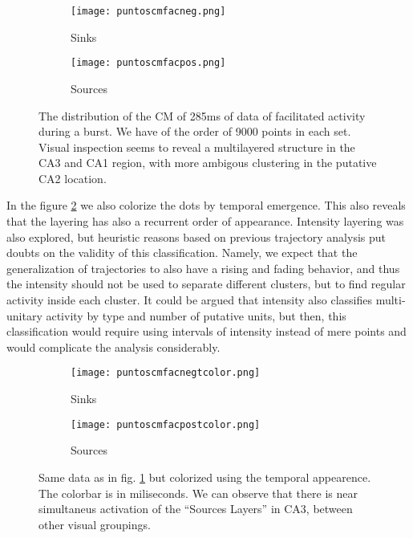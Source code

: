 \documentclass{article}
\begin{document}
\begin{figure}
\centering
\begin{subfigure}{0.40\textwidth}
\texttt{[image: puntoscmfacneg.png]}
\caption{Sinks}
\end{subfigure}
\begin{subfigure}{0.40\textwidth}
\texttt{[image: puntoscmfacpos.png]}
\caption{Sources}
\end{subfigure}

\caption{The distribution of the CM of 285ms of data of facilitated activity
during a burst. We have of the order of 9000 points in each
set. Visual inspection seems to reveal a multilayered structure in the
CA3 and CA1 region, with more ambigous clustering in the putative
CA2 location.}\label{puntostodos}

\end{figure}

In the figure \ref{puntosconcolor} we also colorize the dots by temporal emergence.
This also reveals that the layering has also a recurrent order of appearance. Intensity
layering was also explored, but heuristic reasons based on previous trajectory
analysis put doubts on the validity of this classification. Namely, we expect
that the generalization of trajectories to also have a rising and fading behavior,
and thus the intensity should not be used to separate different clusters, but to
find regular activity inside each cluster. It could be argued that intensity also
classifies multi-unitary activity by type and number of putative units, but then,
this classification would require using intervals of intensity instead of mere
points and would complicate the analysis considerably.


\begin{figure}
\centering
\begin{subfigure}{0.40\textwidth}
\texttt{[image: puntoscmfacnegtcolor.png]}
\caption{Sinks}
\end{subfigure}
\begin{subfigure}{0.40\textwidth}
\texttt{[image: puntoscmfacpostcolor.png]}
\caption{Sources}
\end{subfigure}

\caption{Same data as in fig. \ref{puntostodos} but colorized using
the temporal appearence. The colorbar is in miliseconds. We can observe
that there is near simultaneus activation of the ``Sources Layers'' in CA3,
between other visual groupings. 
}\label{puntosconcolor}

\end{figure}
\end{document}
